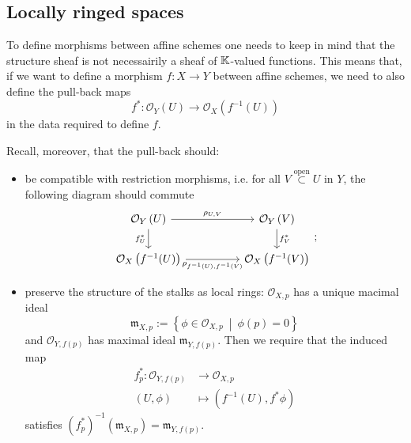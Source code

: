 \subsection{Locally ringed spaces}
\begin{rem}[]
To define morphisms between affine schemes one needs to keep in mind that
the structure sheaf is not necessairily a sheaf of $\mathbb{K}$-valued functions.
This means that, if we want to define a morphism $f: X \to Y$ between affine schemes,
we need to also define the pull-back maps
\begin{equation}
	f^*: \mathcal{O}_{Y} \left( U \right) \to \mathcal{O}_{X} \left( f^{-1}(U) \right)
\end{equation} 
in the data required to define $f$.

Recall, moreover, that the pull-back should:
\begin{itemize}
	\item be compatible with restriction morphisms, i.e. for all $V \stackrel{\text{open}}{\subset} U$ in $Y$,
		the following diagram should commute
		\begin{equation}
			\begin{tikzcd}[column sep=4.9em]
			\mathcal{O}_{Y} \left( U \right) \arrow[r, "\rho_{U,V}", rightarrow] \arrow[d, "f^*_U"', rightarrow] &
			\mathcal{O}_{Y} \left( V \right) \arrow[d, "f^*_{V}", rightarrow] \\
			\mathcal{O}_{X} \left( f^{-1}(U) \right) \arrow[r, "\rho_{f^{-1}(U), f^{-1}(V)}"', rightarrow] &
			\mathcal{O}_{X} \left( f^{-1}(V) \right)
		\end{tikzcd}
		;\end{equation} 
	\item preserve the structure of the stalks as local rings:
		$\mathcal{O}_{X, p}$ has a unique macimal ideal
		\begin{equation}
		\mathfrak{m}_{X, p} := \left\{ \phi \in \mathcal{O}_{X, p}
		\ \middle|\ \phi(p) = 0 \right\}
		\end{equation} 
		and $\mathcal{O}_{Y, f(p)}$ has maximal ideal $\mathfrak{m}_{Y, f(p)}$.
		Then we require that the induced map
		\begin{align}
			f^*_{p}: \mathcal{O}_{Y, f(p)} &\to \mathcal{O}_{X, p} \\
			\left(U, \phi\right) &\mapsto \left(f^{-1}(U), f^* \phi\right)
		\end{align} 
		satisfies $\left( f^*_{p} \right)^{-1}(\mathfrak{m}_{X, p}) =
		\mathfrak{m}_{Y, f(p)}$.
\end{itemize}
\end{rem}

